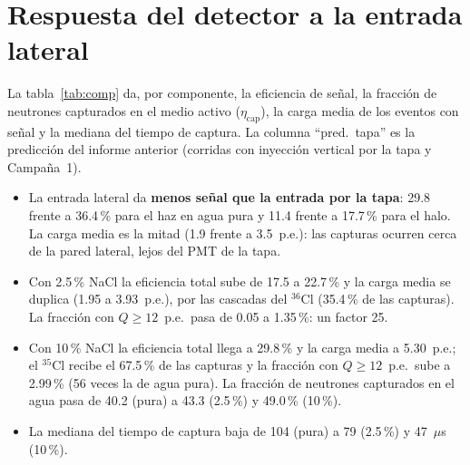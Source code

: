 \documentclass[11pt,a4paper]{article}
\newcommand{\tabla}[1]{}
\begin{document}
\section{Respuesta del detector a la entrada lateral}
La tabla~\ref{tab:comp} da, por componente, la eficiencia de señal, la fracción de neutrones capturados en el
medio activo ($\eta_\text{cap}$), la carga media de los eventos con señal y la mediana del tiempo de captura.
La columna ``pred.\ tapa'' es la predicción del informe anterior (corridas con inyección vertical por la tapa
y Campaña~1).

\begin{table}[H]\centering\small
\tabla{respuesta_componentes}
\caption{Respuesta por componente con entrada lateral. $\varepsilon$: fracción de neutrones incidentes con
carga $\geq1$ o $\geq12$~p.e.; $\eta_\text{cap}$: fracción con al menos una captura en el agua; $\langle
Q\rangle$: carga media de los eventos con $Q\geq1$.}\label{tab:comp}
\end{table}

\begin{itemize}
\item La entrada lateral da \textbf{menos señal que la entrada por la tapa}: 29.8 frente a 36.4\,\% para
el haz en agua pura y 11.4 frente a 17.7\,\% para el halo. La carga media es la mitad (1.9 frente a 3.5~p.e.):
las capturas ocurren cerca de la pared lateral, lejos del PMT de la tapa.
\item Con 2.5\,\% NaCl la eficiencia total sube de 17.5 a 22.7\,\% y la carga media se duplica (1.95 a
3.93~p.e.), por las cascadas del $^{36}$Cl (35.4\,\% de las capturas). La fracción con $Q\geq12$~p.e.\ pasa de
0.05 a 1.35\,\%: un factor 25.
\item Con 10\,\% NaCl la eficiencia total llega a 29.8\,\% y la carga media a 5.30~p.e.; el $^{35}$Cl
recibe el 67.5\,\% de las capturas y la fracción con $Q\geq12$~p.e.\ sube a 2.99\,\% (56 veces la de agua
pura). La fracción de neutrones capturados en el agua pasa de 40.2 (pura) a 43.3 (2.5\,\%) y 49.0\,\% (10\,\%).
\item La mediana del tiempo de captura baja de 104 (pura) a 79 (2.5\,\%) y 47~$\mu$s (10\,\%).
\end{itemize}

\begin{table}[H]\centering\small
\tabla{nucleos_modelo5min}
\caption{Núcleo de la primera captura en el medio y número esperado de eventos para la fuente de 1~Ci en
5~min (modelo del blindaje), con la respuesta lateral simulada.}
\end{table}
\end{document}
